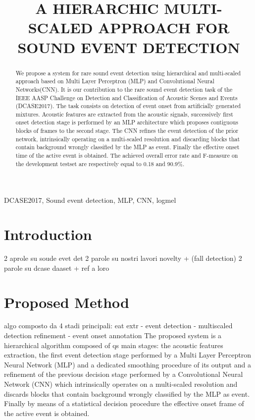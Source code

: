 \documentclass{article}
\title{A HIERARCHIC MULTI-SCALED APPROACH FOR SOUND EVENT DETECTION}
\begin{document}
\ninept
\maketitle

\begin{sloppy}

\begin{abstract}
We propose a system for rare sound event detection using hierarchical and multi-scaled approach based on Multi Layer Perceptron (MLP) and Convolutional Neural Networks(CNN). 
It is our contribution to the rare sound event detection task of the IEEE AASP Challenge on  Detection and Classification of Acoustic Scenes and Events (DCASE2017). The task consists on detection of event onset from artificially generated mixtures. Acoustic features are extracted from the acoustic signals, successively first onset detection stage is performed by an MLP architecture which proposes contiguous blocks of frames to the second stage. The CNN refines the event detection of the prior network, intrinsically operating on a multi-scaled resolution and discarding blocks that contain background wrongly classified by the MLP as event. Finally the effective onset time of the active event is obtained.
The achieved overall error rate and F-measure on the development testset are respectively equal to 0.18 and 90.9\%.
\end{abstract}

\begin{keywords}
DCASE2017, Sound event detection, MLP, CNN, logmel
\end{keywords}


\section{Introduction}
\label{sec:intro}

\label{sec:format}
2 aprole su soude evet det
2 parole su nostri lavori novelty + (fall detection)
2 parole su dcase daaset + ref a loro



\section{Proposed Method}
\label{sec:pagelimit}
algo composto da 4 stadi principali: eat extr - event detection - multiscaled detection refinement - event onset annotation 
The proposed system is a hierarchical algorithm composed of qs main stages: the acoustic features extraction, the first event detection stage performed by a Multi Layer Perceptron Neural Network (MLP) and a dedicated smoothing procedure of its output and a refinement of the previous decision stage performed by a Convolutional Neural Network (CNN) which intrinsically operates on a multi-scaled resolution and discards blocks that contain background wrongly classified by the MLP as event. Finally by means of a statistical decision procedure the effective onset frame of the active event is obtained.


\end{sloppy}
\end{document}
